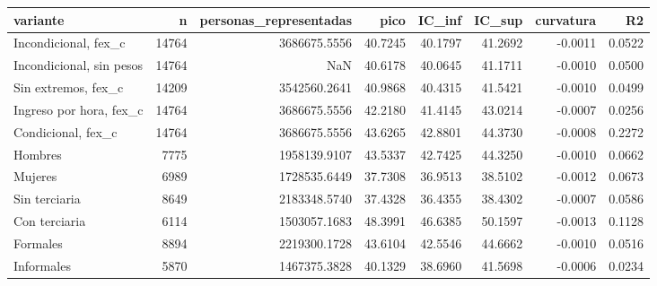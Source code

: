 \begin{tabular}{lrrrrrrr}
\toprule
variante & n & personas\_representadas & pico & IC\_inf & IC\_sup & curvatura & R2 \\
\midrule
Incondicional, fex\_c & 14764 & 3686675.5556 & 40.7245 & 40.1797 & 41.2692 & -0.0011 & 0.0522 \\
Incondicional, sin pesos & 14764 & NaN & 40.6178 & 40.0645 & 41.1711 & -0.0010 & 0.0500 \\
Sin extremos, fex\_c & 14209 & 3542560.2641 & 40.9868 & 40.4315 & 41.5421 & -0.0010 & 0.0499 \\
Ingreso por hora, fex\_c & 14764 & 3686675.5556 & 42.2180 & 41.4145 & 43.0214 & -0.0007 & 0.0256 \\
Condicional, fex\_c & 14764 & 3686675.5556 & 43.6265 & 42.8801 & 44.3730 & -0.0008 & 0.2272 \\
Hombres & 7775 & 1958139.9107 & 43.5337 & 42.7425 & 44.3250 & -0.0010 & 0.0662 \\
Mujeres & 6989 & 1728535.6449 & 37.7308 & 36.9513 & 38.5102 & -0.0012 & 0.0673 \\
Sin terciaria & 8649 & 2183348.5740 & 37.4328 & 36.4355 & 38.4302 & -0.0007 & 0.0586 \\
Con terciaria & 6114 & 1503057.1683 & 48.3991 & 46.6385 & 50.1597 & -0.0013 & 0.1128 \\
Formales & 8894 & 2219300.1728 & 43.6104 & 42.5546 & 44.6662 & -0.0010 & 0.0516 \\
Informales & 5870 & 1467375.3828 & 40.1329 & 38.6960 & 41.5698 & -0.0006 & 0.0234 \\
\bottomrule
\end{tabular}
